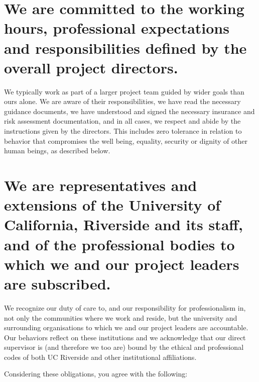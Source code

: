 \documentclass[
]{book}
\begin{document}
\hypertarget{we-are-committed-to-the-working-hours-professional-expectations-and-responsibilities-defined-by-the-overall-project-directors.}{%
\section{We are committed to the working hours, professional expectations and responsibilities defined by the overall project directors.}\label{we-are-committed-to-the-working-hours-professional-expectations-and-responsibilities-defined-by-the-overall-project-directors.}}

We typically work as part of a larger project team guided by wider goals than ours alone. We are aware of their responsibilities, we have read the necessary guidance documents, we have understood and signed the necessary insurance and risk assessment documentation, and in all cases, we respect and abide by the instructions given by the directors. This includes zero tolerance in relation to behavior that compromises the well being, equality, security or dignity of other human beings, as described below.

\hypertarget{we-are-representatives-and-extensions-of-the-university-of-california-riverside-and-its-staff-and-of-the-professional-bodies-to-which-we-and-our-project-leaders-are-subscribed.}{%
\section{We are representatives and extensions of the University of California, Riverside and its staff, and of the professional bodies to which we and our project leaders are subscribed.}\label{we-are-representatives-and-extensions-of-the-university-of-california-riverside-and-its-staff-and-of-the-professional-bodies-to-which-we-and-our-project-leaders-are-subscribed.}}

We recognize our duty of care to, and our responsibility for professionalism in, not only the communities where we work and reside, but the university and surrounding organisations to which we and our project leaders are accountable. Our behaviors reflect on these institutions and we acknowledge that our direct supervisor is (and therefore we too are) bound by the ethical and professional codes of both UC Riverside and other institutional affiliations.

Considering these obligations, you agree with the following:
\end{document}
